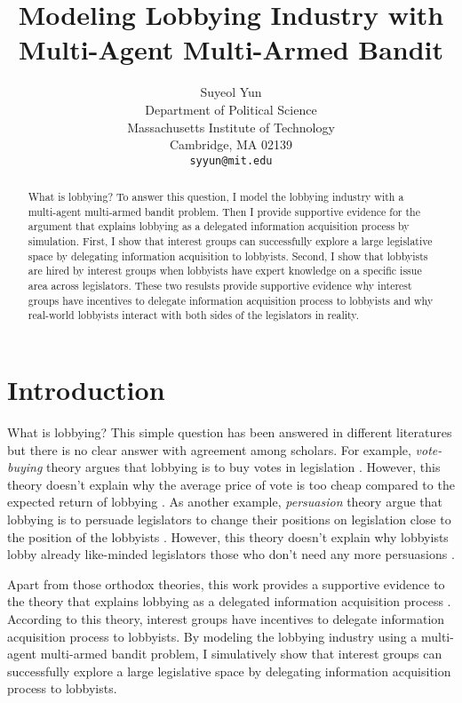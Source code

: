 \documentclass{article}
\title{Modeling 
Lobbying Industry with Multi-Agent Multi-Armed Bandit}
\author{%
Suyeol Yun
\\
Department of Political Science\\
Massachusetts Institute of Technology\\
Cambridge, MA 02139 \\
\texttt{syyun@mit.edu} \\
}
\begin{document}
\maketitle
\begin{abstract}
What is lobbying?
To answer this question, 
I model the lobbying industry 
with a multi-agent multi-armed bandit problem.
Then I provide supportive evidence 
for the argument 
that explains lobbying 
as a delegated information acquisition process by simulation.
First, I show that 
interest groups can successfully explore 
a large legislative space
by delegating information acquisition to lobbyists.
Second, I show that 
lobbyists are hired by interest groups
when lobbyists have 
expert knowledge on a specific issue area 
across legislators.
These two resulsts  
provide supportive evidence
why interest groups 
have incentives to delegate information acquisition process to lobbyists
and why real-world lobbyists interact with both sides of the legislators in reality.
\end{abstract}

\section{Introduction}
What is lobbying? 
This simple question has been answered in different literatures 
\citep{hall_deardorff_2006, 10.2307/43495360, 10.2307/3216842}
but there is no clear answer with agreement among scholars.
For example, \textit{vote-buying} theory argues 
that lobbying is to buy votes in legislation \citep{grossman}. 
However, this theory doesn't explain 
why the average price of vote is too cheap compared 
to the expected return of lobbying \citep{10.2307/3216842}.
As another example, \textit{persuasion} 
theory argue that lobbying is to persuade 
legislators to change their positions on legislation close to 
the position of the lobbyists
\citep{truman, Bauer2017, milbrath1984washington}.
However, this theory doesn't 
explain why lobbyists lobby 
already like-minded legislators 
those who don't need any more persuasions \citep{10.2307/2586303}.

Apart from those orthodox theories,
this work 
provides a supportive evidence 
to the theory 
that explains lobbying as a 
delegated information acquisition process \citep{rif}.
According to this theory, interest groups 
have incentives to delegate information acquisition process to lobbyists.
By modeling the lobbying industry 
using a multi-agent multi-armed bandit problem,
I simulatively show that
interest groups can successfully explore 
a large legislative space by delegating information acquisition process to lobbyists.
\end{document}
